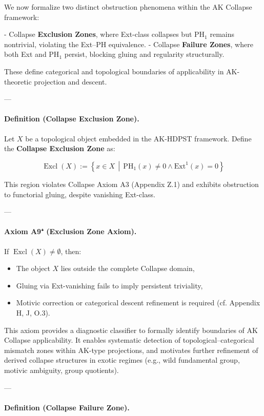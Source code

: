 \documentclass[11pt]{article}
\begin{document}
\begin{axiom}
\begin{axiom}
{{We now formalize two distinct obstruction phenomena within the AK Collapse framework:

- Collapse \textbf{Exclusion Zones}, where Ext-class collapses but PH$_1$ remains nontrivial, violating the Ext–PH equivalence.
- Collapse \textbf{Failure Zones}, where both Ext and PH$_1$ persist, blocking gluing and regularity structurally.

These define categorical and topological boundaries of applicability in AK-theoretic projection and descent.

---

\paragraph{Definition (Collapse Exclusion Zone).}
Let \( X \) be a topological object embedded in the AK-HDPST framework.  
Define the \textbf{Collapse Exclusion Zone} as:

\[
\operatorname{Excl}(X) := \left\{ x \in X \,\middle|\, \mathrm{PH}_1(x) \neq 0 \land \mathrm{Ext}^1(x) = 0 \right\}
\]

This region violates Collapse Axiom A3 (Appendix Z.1) and exhibits obstruction to functorial gluing, despite vanishing Ext-class.

---

\paragraph{Axiom A9⁺ (Exclusion Zone Axiom).}
If \( \operatorname{Excl}(X) \neq \emptyset \), then:
\begin{itemize}
  \item The object \( X \) lies outside the complete Collapse domain,
  \item Gluing via Ext-vanishing fails to imply persistent triviality,
  \item Motivic correction or categorical descent refinement is required (cf. Appendix H, J, O.3).
\end{itemize}

This axiom provides a diagnostic classifier to formally identify boundaries of AK Collapse applicability.  
It enables systematic detection of topological–categorical mismatch zones within AK-type projections, and motivates further refinement of derived collapse structures in exotic regimes (e.g., wild fundamental group, motivic ambiguity, group quotients).

---

\paragraph{Definition (Collapse Failure Zone).}

}}
\end{axiom}
\end{axiom}
\end{document}
